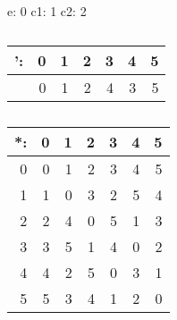 \begin{table}[H]  \centering %
e: 0 \hspace{.5cm}
c1: 1 \hspace{.5cm}
c2: 2 \hspace{.5cm}
\begin{tabular}{r|rrrrrr}
': & 0 & 1 & 2 & 3 & 4 & 5\\
\hline
   & 0 & 1 & 2 & 4 & 3 & 5
\end{tabular} \hspace{.5cm}
\begin{tabular}{r|rrrrrr}
*: & 0 & 1 & 2 & 3 & 4 & 5\\
\hline
    0 & 0 & 1 & 2 & 3 & 4 & 5 \\
    1 & 1 & 0 & 3 & 2 & 5 & 4 \\
    2 & 2 & 4 & 0 & 5 & 1 & 3 \\
    3 & 3 & 5 & 1 & 4 & 0 & 2 \\
    4 & 4 & 2 & 5 & 0 & 3 & 1 \\
    5 & 5 & 3 & 4 & 1 & 2 & 0
\end{tabular}
\caption{ }
\end{table}

